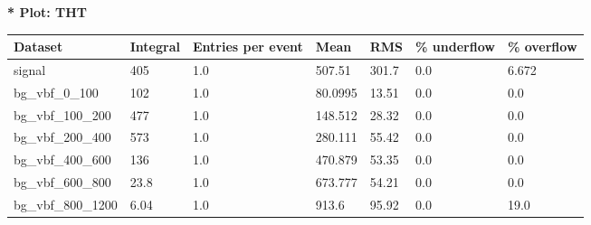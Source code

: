 \documentclass[a4paper, 10pt]{article}
\begin{document}
\textbf{* Plot: THT}\\
   \begin{table}[H]
  \begin{center}
    \begin{tabular}{|m{23.0mm}|m{23.0mm}|m{18.0mm}|m{19.0mm}|m{19.0mm}|m{19.0mm}|m{19.0mm}|}
      \hline
      {\cellcolor{yellow}         Dataset}& {\cellcolor{yellow}         Integral}& {\cellcolor{yellow}         Entries per event}& {\cellcolor{yellow}         Mean}& {\cellcolor{yellow}         RMS}& {\cellcolor{yellow}         \% underflow}& {\cellcolor{yellow}         \% overflow}\\
      \hline
      {\cellcolor{white}         signal}& {\cellcolor{white}         405}& {\cellcolor{white}         1.0}& {\cellcolor{white}         507.51}& {\cellcolor{white}         301.7}& {\cellcolor{orange}         0.0}& {\cellcolor{orange}         6.672}\\
      \hline
      {\cellcolor{white}         bg\_vbf\_0\_100}& {\cellcolor{white}         102}& {\cellcolor{white}         1.0}& {\cellcolor{white}         80.0995}& {\cellcolor{white}         13.51}& {\cellcolor{green}         0.0}& {\cellcolor{green}         0.0}\\
      \hline
      {\cellcolor{white}         bg\_vbf\_100\_200}& {\cellcolor{white}         477}& {\cellcolor{white}         1.0}& {\cellcolor{white}         148.512}& {\cellcolor{white}         28.32}& {\cellcolor{green}         0.0}& {\cellcolor{green}         0.0}\\
      \hline
      {\cellcolor{white}         bg\_vbf\_200\_400}& {\cellcolor{white}         573}& {\cellcolor{white}         1.0}& {\cellcolor{white}         280.111}& {\cellcolor{white}         55.42}& {\cellcolor{green}         0.0}& {\cellcolor{green}         0.0}\\
      \hline
      {\cellcolor{white}         bg\_vbf\_400\_600}& {\cellcolor{white}         136}& {\cellcolor{white}         1.0}& {\cellcolor{white}         470.879}& {\cellcolor{white}         53.35}& {\cellcolor{green}         0.0}& {\cellcolor{green}         0.0}\\
      \hline
      {\cellcolor{white}         bg\_vbf\_600\_800}& {\cellcolor{white}         23.8}& {\cellcolor{white}         1.0}& {\cellcolor{white}         673.777}& {\cellcolor{white}         54.21}& {\cellcolor{green}         0.0}& {\cellcolor{green}         0.0}\\
      \hline
      {\cellcolor{white}         bg\_vbf\_800\_1200}& {\cellcolor{white}         6.04}& {\cellcolor{white}         1.0}& {\cellcolor{white}         913.6}& {\cellcolor{white}         95.92}& {\cellcolor{red}         0.0}& {\cellcolor{red}         19.0}\\

\end{tabular}
\end{center}
\end{table}
\end{document}
